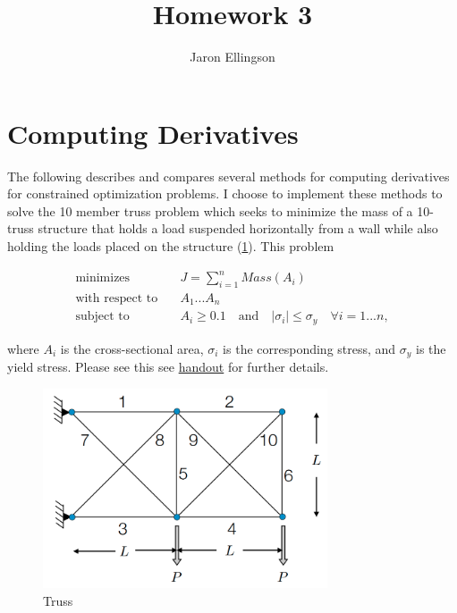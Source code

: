 \documentclass{article}
\begin{document}
\title{Homework 3}
\author{Jaron Ellingson}
\maketitle


\section*{Computing Derivatives}

The following describes and compares several methods for computing derivatives for constrained optimization problems. I choose to implement these methods to solve the 10 member truss problem which seeks to minimize the mass of a 10-truss structure that holds a load suspended horizontally from a wall  while also holding the loads placed on the structure (\cref{fig:truss}). This problem 

\begin{equation*}
\begin{aligned}
\text{minimizes} & \quad J= \sum_{i=1}^{n} Mass(A_i) \\
\text{with respect to} & \quad A_1 ... A_{n} \\
\text{subject to} & \quad A_i \ge 0.1 \quad \text{and} \quad | \sigma_i | \le \sigma_y \quad \forall i=1 ... n,
\end{aligned}
\end{equation*}

where $A_i$ is the cross-sectional area, $\sigma_i$ is the corresponding stress, and $\sigma_y$ is the yield stress. Please see this see \href{https://byu.box.com/shared/static/h8gzy7nuzzk42ta7388y1luj3yhgsltq.pdf}{handout} for further details.


\begin{figure}[htbp]
	\centering
	
	\includegraphics[width=0.75\textwidth]{truss.png}
	
	\caption{Truss}
	\label{fig:truss}
\end{figure}
\end{document}

